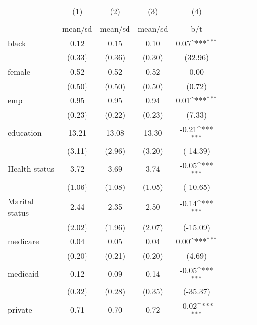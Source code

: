 {
\def\sym#1{\ifmmode^{#1}\else\(^{#1}\)\fi}
\begin{tabular}{l*{4}{cc}}
\hline\hline
                    &\multicolumn{1}{c}{(1)}&\multicolumn{1}{c}{(2)}&\multicolumn{1}{c}{(3)}&\multicolumn{1}{c}{(4)}\\
                    &\multicolumn{1}{c}{}&\multicolumn{1}{c}{}&\multicolumn{1}{c}{}&\multicolumn{1}{c}{} \\
                    &     mean/sd&     mean/sd&     mean/sd&         b/t         \\
\hline
black               &        0.12&        0.15&        0.10&        0.05\sym{***}\\
                    &      (0.33)&      (0.36)&      (0.30)&     (32.96)         \\
female              &        0.52&        0.52&        0.52&        0.00         \\
                    &      (0.50)&      (0.50)&      (0.50)&      (0.72)         \\
emp                 &        0.95&        0.95&        0.94&        0.01\sym{***}\\
                    &      (0.23)&      (0.22)&      (0.23)&      (7.33)         \\
education           &       13.21&       13.08&       13.30&       -0.21\sym{***}\\
                    &      (3.11)&      (2.96)&      (3.20)&    (-14.39)         \\
Health status       &        3.72&        3.69&        3.74&       -0.05\sym{***}\\
                    &      (1.06)&      (1.08)&      (1.05)&    (-10.65)         \\
Marital status      &        2.44&        2.35&        2.50&       -0.14\sym{***}\\
                    &      (2.02)&      (1.96)&      (2.07)&    (-15.09)         \\
medicare            &        0.04&        0.05&        0.04&        0.00\sym{***}\\
                    &      (0.20)&      (0.21)&      (0.20)&      (4.69)         \\
medicaid            &        0.12&        0.09&        0.14&       -0.05\sym{***}\\
                    &      (0.32)&      (0.28)&      (0.35)&    (-35.37)         \\
private             &        0.71&        0.70&        0.72&       -0.02\sym{***}\\

\end{tabular}}
